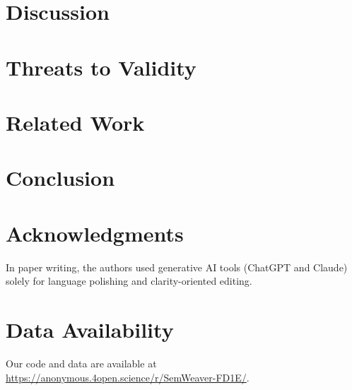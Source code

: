 \documentclass[acmsmall,screen,review,anonymous]{acmart}
\begin{document}
\section{Discussion}\label{sec:discussion}


\section{Threats to Validity}\label{sec:threats}


\section{Related Work}\label{sec:related}


\section{Conclusion}\label{sec:conclusion}


\section*{Acknowledgments}
In paper writing, the authors used generative AI tools (ChatGPT and Claude) solely for language polishing and clarity-oriented editing.


\section*{Data Availability}
Our code and data are available at \url{https://anonymous.4open.science/r/SemWeaver-FD1E/}.

\begingroup
{}


\endgroup
\end{document}
